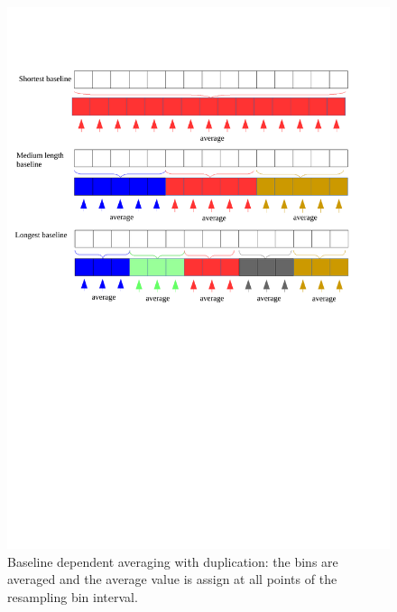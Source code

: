 \documentclass[useAMS,usenatbib]{mn2e}
\begin{document}
\begin{figure}
\includegraphics[width=\columnwidth]{./Figures/bda_averaging_duplication_senario.pdf}
\caption{Baseline dependent averaging with duplication: the bins are averaged and the average
value is assign at all points of the resampling bin interval.}\label{fig:bdavgduplication}
\end{figure}
\end{document}
